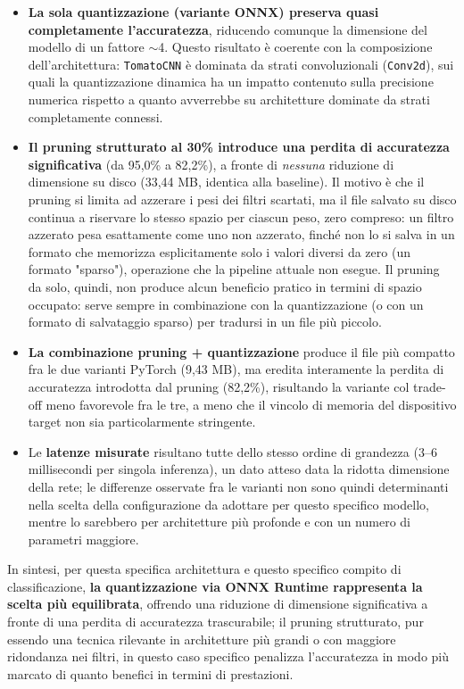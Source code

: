 \begin{itemize}
    \item \textbf{La sola quantizzazione (variante ONNX) preserva quasi
    completamente l'accuratezza}, riducendo comunque la dimensione del
    modello di un fattore $\sim$4. Questo risultato è coerente con la
    composizione dell'architettura: \texttt{TomatoCNN} è dominata da strati
    convoluzionali (\texttt{Conv2d}), sui quali la quantizzazione dinamica
    ha un impatto contenuto sulla precisione numerica rispetto a quanto
    avverrebbe su architetture dominate da strati completamente connessi.
    \item \textbf{Il pruning strutturato al 30\% introduce una perdita di
    accuratezza significativa} (da 95,0\% a 82,2\%), a fronte di
    \emph{nessuna} riduzione di dimensione su disco (33,44 MB, identica alla
    baseline). Il motivo è che il pruning si limita ad azzerare i pesi dei
    filtri scartati, ma il file salvato su disco continua a riservare lo
    stesso spazio per ciascun peso, zero compreso: un filtro azzerato pesa
    esattamente come uno non azzerato, finché non lo si salva in un formato
    che memorizza esplicitamente solo i valori diversi da zero (un formato
    "sparso"), operazione che la pipeline attuale non esegue. Il pruning da
    solo, quindi, non produce alcun beneficio pratico in termini di
    spazio occupato: serve sempre in combinazione con la quantizzazione (o
    con un formato di salvataggio sparso) per tradursi in un file più
    piccolo.
    \item \textbf{La combinazione pruning + quantizzazione} produce il file
    più compatto fra le due varianti PyTorch (9,43 MB), ma eredita
    interamente la perdita di accuratezza introdotta dal pruning
    (82,2\%), risultando la variante col trade-off meno favorevole fra le
    tre, a meno che il vincolo di memoria del dispositivo target non sia
    particolarmente stringente.
    \item Le \textbf{latenze misurate} risultano tutte dello stesso ordine
    di grandezza (3--6 millisecondi per singola inferenza), un dato atteso
    data la ridotta dimensione della rete; le differenze osservate fra le
    varianti non sono quindi determinanti nella scelta della configurazione
    da adottare per questo specifico modello, mentre lo sarebbero per
    architetture più profonde e con un numero di parametri maggiore.
\end{itemize}

In sintesi, per questa specifica architettura e questo specifico compito di
classificazione, \textbf{la quantizzazione via ONNX Runtime rappresenta la
scelta più equilibrata}, offrendo una riduzione di dimensione significativa
a fronte di una perdita di accuratezza trascurabile; il pruning strutturato,
pur essendo una tecnica rilevante in architetture più grandi o con maggiore
ridondanza nei filtri, in questo caso specifico penalizza l'accuratezza in
modo più marcato di quanto benefici in termini di prestazioni.

